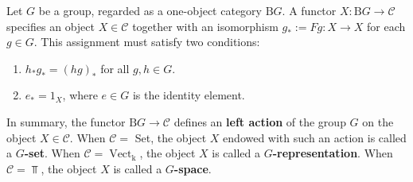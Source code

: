 \documentclass[12pt, oneside]{book}
\begin{document}
\begin{definition}
    Let $G$ be a group, regarded as a one-object category $\mathrm{B} G$.
    A functor $X: \mathrm{B} G \rightarrow \mathcal{C}$ specifies an object $X \in \mathcal{C}$ together with an isomorphism $g_*:=Fg: X \rightarrow X$ for each $g \in G$. This assignment must satisfy two conditions:
    \begin{enumerate}[label=(\roman*)]
        \item
              $h_* g_*=(h g)_*$ for all $g, h \in G$.
        \item
              $e_*=1_X$, where $e \in G$ is the identity element.
    \end{enumerate}
    In summary, the functor $\mathrm{B} G \rightarrow \mathcal{C}$ defines an \textbf{left action} of the group $G$ on the object $X \in \mathcal{C}$.
    When $\mathcal{C}=$ Set, the object $X$ endowed with such an action is called a \textbf{$G$-set}. When $\mathcal{C}=\operatorname{Vect}_{\mathrm{k}}$, the object $X$ is called a \textbf{$G$-representation}.
    When $\mathcal{C}=\Top$, the object $X$ is called a \textbf{$G$-space}.
\end{definition}
\end{document}
